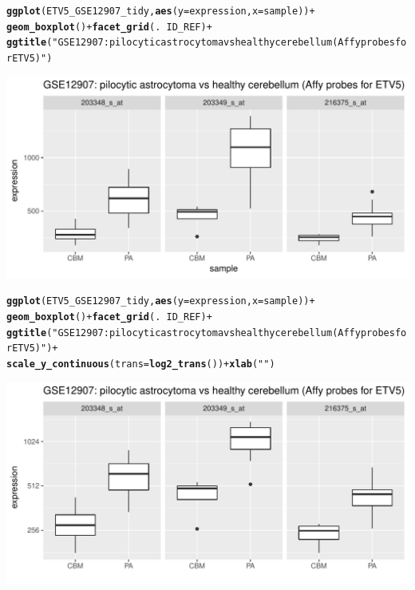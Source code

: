 \documentclass{article}\usepackage[]{graphicx}\usepackage[]{color}
\makeatletter
\def\maxwidth{ %
  \ifdim\Gin@nat@width>\linewidth
    \linewidth
  \else
    \Gin@nat@width
  \fi
}
\newcommand{\hlstr}[1]{\textcolor[rgb]{0.192,0.494,0.8}{#1}}%
\newcommand{\hlopt}[1]{\textcolor[rgb]{0,0,0}{#1}}%
\newcommand{\hlstd}[1]{\textcolor[rgb]{0.345,0.345,0.345}{#1}}%
\newcommand{\hlkwc}[1]{\textcolor[rgb]{0.333,0.667,0.333}{#1}}%
\newcommand{\hlkwd}[1]{\textcolor[rgb]{0.737,0.353,0.396}{\textbf{#1}}}%
\newenvironment{kframe}{%
 \def\at@end@of@kframe{}%
 \ifinner\ifhmode%
  \def\at@end@of@kframe{\end{minipage}}%
  \begin{minipage}{\columnwidth}%
 \fi\fi%
 \def\FrameCommand##1{\hskip\@totalleftmargin \hskip-\fboxsep
 \colorbox{shadecolor}{##1}\hskip-\fboxsep
     \hskip-\linewidth \hskip-\@totalleftmargin \hskip\columnwidth}%
 \MakeFramed {\advance\hsize-\width
   \@totalleftmargin\z@ \linewidth\hsize
   \@setminipage}}%
 {\par\unskip\endMakeFramed%
 \at@end@of@kframe}
\newenvironment{knitrout}{}{} %
\makeatother
\begin{document}
\begin{knitrout}
\begin{kframe}
\begin{alltt}
\hlkwd{ggplot}\hlstd{(ETV5_GSE12907_tidy,} \hlkwd{aes}\hlstd{(}\hlkwc{y}\hlstd{=expression,} \hlkwc{x}\hlstd{=sample))} \hlopt{+}
  \hlkwd{geom_boxplot}\hlstd{()} \hlopt{+} \hlkwd{facet_grid}\hlstd{(.}\hlopt{~}\hlstd{ID_REF)} \hlopt{+}
  \hlkwd{ggtitle}\hlstd{(}\hlstr{"GSE12907: pilocytic astrocytoma vs healthy cerebellum (Affy probes for ETV5)"}\hlstd{)}
\end{alltt}
\end{kframe}
\includegraphics[width=\maxwidth]{figure/unnamed-chunk-23-3} 
\begin{kframe}\begin{alltt}
\hlkwd{ggplot}\hlstd{(ETV5_GSE12907_tidy,} \hlkwd{aes}\hlstd{(}\hlkwc{y}\hlstd{=expression,} \hlkwc{x}\hlstd{=sample))} \hlopt{+}
  \hlkwd{geom_boxplot}\hlstd{()} \hlopt{+} \hlkwd{facet_grid}\hlstd{(.}\hlopt{~}\hlstd{ID_REF)} \hlopt{+}
  \hlkwd{ggtitle}\hlstd{(}\hlstr{"GSE12907: pilocytic astrocytoma vs healthy cerebellum (Affy probes for ETV5)"}\hlstd{)} \hlopt{+}
  \hlkwd{scale_y_continuous}\hlstd{(}\hlkwc{trans}\hlstd{=}\hlkwd{log2_trans}\hlstd{())} \hlopt{+} \hlkwd{xlab}\hlstd{(}\hlstr{""}\hlstd{)}
\end{alltt}
\end{kframe}
\includegraphics[width=\maxwidth]{figure/unnamed-chunk-23-4} 

\end{knitrout}
\end{document}
